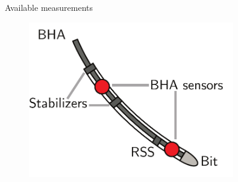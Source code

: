 \documentclass[10pt]{beamer}
\begin{document}
\begin{frame}{Available measurements}
	\begin{figure}[ht]\centering
				\includegraphics[width=0.8\textwidth]{images/Sensors.pdf}
	\end{figure}
\end{frame}
\end{document}
